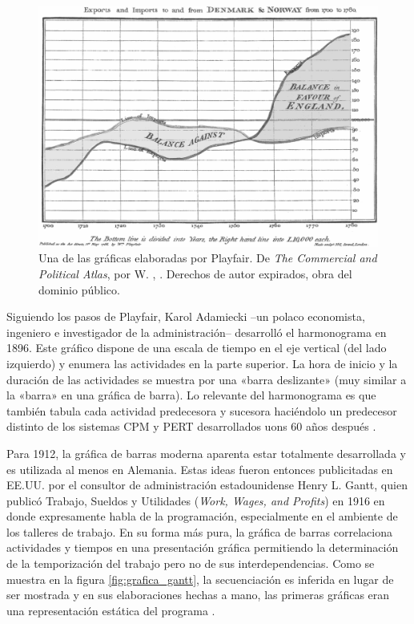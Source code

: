 \documentclass[draft,12pt,headsepline,footsepline,paper=letter]{scrreprt}
\begin{document}
\begin{figure}
\includegraphics[width=\textwidth]{media/Playfair_TimeSeries.png}
\caption[Gráfica del Atlas de W. Playfair]{Una de las gráficas elaboradas por Playfair. De \textit{The Commercial and Political Atlas}, por W. \citeauthor{playfair1786commercial}, \citeyear{playfair1786commercial}. Derechos de autor expirados, obra del dominio público.}
\label{fig:playfair_timeseries}
\end{figure}

Siguiendo los pasos de Playfair, Karol Adamiecki –un polaco economista, ingeniero e investigador de la administración– desarrolló el harmonograma en 1896. Este gráfico dispone de una escala de tiempo en el eje  vertical (del lado izquierdo) y enumera las actividades en la parte superior. La hora de inicio y la duración de las actividades se muestra por una «barra deslizante» (muy similar a la «barra» en una gráfica de barra). Lo relevante del harmonograma es que también tabula cada actividad predecesora y sucesora haciéndolo un predecesor distinto de los sistemas CPM y PERT desarrollados uons 60 años después \citep[p.~3]{Weaver2006}.

Para 1912, la gráfica de barras moderna aparenta estar totalmente desarrollada y es utilizada al menos en Alemania. Estas ideas fueron entonces publicitadas en EE.UU. por el consultor de administración estadounidense Henry L. Gantt, quien publicó Trabajo, Sueldos y Utilidades (\textit{Work, Wages, and Profits}) en 1916 en donde expresamente habla de la programación, especialmente en el ambiente de los talleres de trabajo. En su forma más pura, la gráfica de barras correlaciona actividades y tiempos en una presentación gráfica permitiendo la determinación de la temporización del trabajo pero no de sus interdependencias. Como se muestra en la figura \ref{fig:grafica_gantt}, la secuenciación es inferida en lugar de ser mostrada y en sus elaboraciones hechas a mano, las primeras gráficas eran una representación estática del programa \citep[p.~3]{Weaver2006}.
\end{document}
